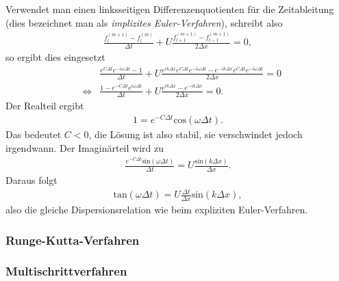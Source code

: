 \documentclass{book}
\renewcommand{\sin}{\text{sin}}
\renewcommand{\cos}{\text{cos}}
\renewcommand{\tan}{\text{tan}}
\begin{document}
Verwendet man einen linksseitigen Differenzenquotienten für die Zeitableitung (dies bezeichnet man als \textit{implizites Euler-Verfahren}),  schreibt also
%
\begin{eqnarray}
\frac{f_l^{(m + 1)} - f_l^{(m)}}{\Delta t} + U\frac{f_{l + 1}^{(m + 1)} - f_{l - 1}^{(m + 1)}}{2\Delta x} = 0, 
\end{eqnarray}
%
so ergibt dies eingesetzt
%
\begin{eqnarray}
&&\frac{e^{C\Delta t}e^{-i\omega\Delta t} - 1}{\Delta t} + U \frac{e^{ik\Delta x}e^{C\Delta t}e^{-i\omega\Delta t} - e^{-ik\Delta x}e^{C\Delta t}e^{-i\omega\Delta t}}{2\Delta x} = 0 \nonumber\\
&\Leftrightarrow&\frac{1 - e^{-C\Delta t}e^{i\omega\Delta t}}{\Delta t} + U \frac{e^{ik\Delta x} - e^{-ik\Delta x}}{2\Delta x} = 0.
\end{eqnarray}
%
Der Realteil ergibt
%
\begin{eqnarray}
1 = e^{-C\Delta t}\cos\left(\omega\Delta t\right).
\end{eqnarray}
%
Das bedeutet $C < 0$, die Lösung ist also stabil, sie verschwindet jedoch irgendwann. Der Imaginärteil wird zu
%
\begin{eqnarray}
\frac{e^{-C\Delta t}\sin\left(\omega\Delta t\right)}{\Delta t} = U\frac{\sin\left(k\Delta x\right)}{\Delta x}.
\end{eqnarray}
%
Daraus folgt
%
\begin{eqnarray}
\tan\left(\omega\Delta t\right) = U\frac{\Delta t}{\Delta x}\sin\left(k\Delta x\right), 
\end{eqnarray}
%
also die gleiche Dispersionsrelation wie beim expliziten Euler-Verfahren.

\subsubsection{Runge-Kutta-Verfahren}
\label{sec:runge-kutta-verfahren}

\subsubsection{Multischrittverfahren}
\label{sec:multischritverfahren}
\end{document}
